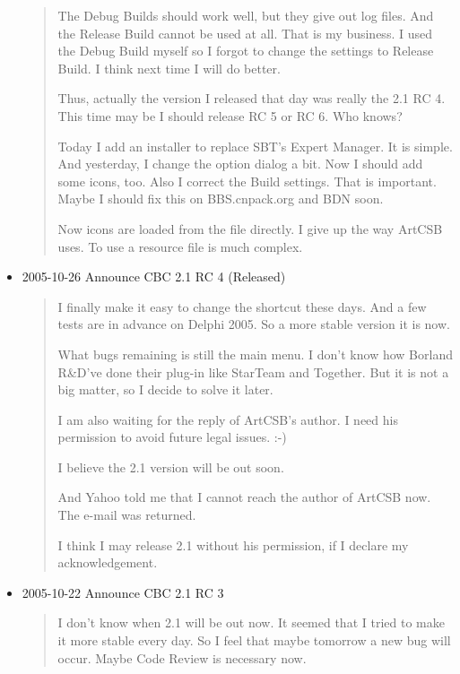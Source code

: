 \begin{itemize}
\begin{quotation}
    The Debug Builds should work well, but they give out log files. And
    the Release Build cannot be used at all. That is my business. I
    used the Debug Build myself so I forgot to change the settings to
    Release Build. I think next time I will do better.

    Thus, actually the version I released that day was really the 2.1 RC
    4. This time may be I should release RC 5 or RC 6. Who knows?

    Today I add an installer to replace SBT's Expert Manager. It is
    simple. And yesterday, I change the option dialog a bit. Now I should
    add some icons, too. Also I correct the Build settings. That is
    important. Maybe I should fix this on BBS.cn\-pack.org and BDN soon.

    Now icons are loaded from the file directly. I give up the way ArtCSB
    uses. To use a resource file is much complex.

  \end{quotation}

  \item 2005-10-26 Announce CBC 2.1 RC 4 (Released)

  \begin{quotation}
    I finally make it easy to change the shortcut these days. And a few
    tests are in advance on Delphi 2005. So a more stable version it is
    now.

    What bugs remaining is still the main menu. I don't know how
    Borland R\&D've done their plug-in like StarTeam and Together. But
    it is not a big matter, so I decide to solve it later.

    I am also waiting for the reply of ArtCSB's author. I need his
    permission to avoid future legal issues. :-)

    I believe the 2.1 version will be out soon.

    And Yahoo told me that I cannot reach the author of ArtCSB now. The
    e-mail was returned.

    I think I may release 2.1 without his permission, if I declare my
    acknowledgement.

  \end{quotation}

  \item 2005-10-22 Announce CBC 2.1 RC 3

  \begin{quotation}
    I don't know when 2.1 will be out now. It seemed that I tried to
    make it more stable every day. So I feel that maybe tomorrow a new
    bug will occur. Maybe Code Review is necessary now.


\end{quotation}
\end{itemize}
